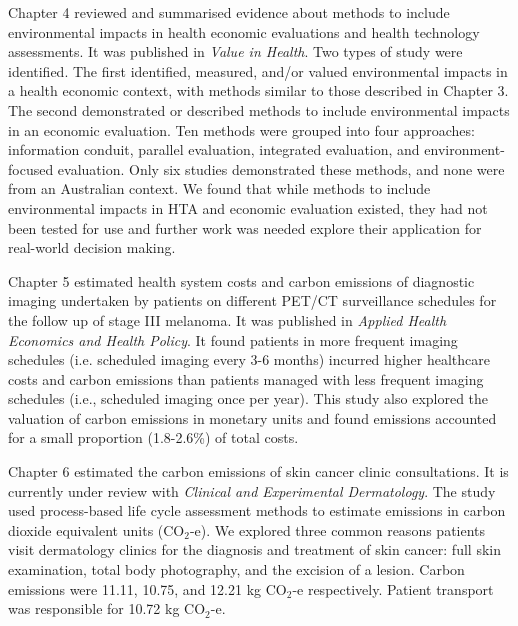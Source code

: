 \begin{refsection}
Chapter 4 reviewed and summarised evidence about methods to include environmental impacts in health economic evaluations and health technology assessments. It was published in \textit{Value in Health}. Two types of study were identified. The first identified, measured, and/or valued environmental impacts in a health economic context, with methods similar to those described in Chapter 3. The second demonstrated or described methods to include environmental impacts in an economic evaluation. Ten methods were grouped into four approaches: information conduit, parallel evaluation, integrated evaluation, and environment-focused evaluation. Only six studies demonstrated these methods, and none were from an Australian context. We found that while methods to include environmental impacts in HTA and economic evaluation existed, they had not been tested for use and further work was needed explore their application for real-world decision making. 

Chapter 5 estimated health system costs and carbon emissions of diagnostic imaging undertaken by patients on different PET/CT surveillance schedules for the follow up of stage III melanoma. It was published in \textit{Applied Health Economics and Health Policy}. It found patients in more frequent imaging schedules (i.e. scheduled imaging every 3-6 months) incurred higher healthcare costs and carbon emissions than patients managed with less frequent imaging schedules (i.e., scheduled imaging once per year). This study also explored the valuation of carbon emissions in monetary units and found emissions accounted for a small proportion (1.8-2.6\%) of total costs.

Chapter 6 estimated the carbon emissions of skin cancer clinic consultations. It is currently under review with \textit{Clinical and Experimental Dermatology}. The study used process-based life cycle assessment methods to estimate emissions in carbon dioxide equivalent units (CO$_{2}$-e). We explored three common reasons patients visit dermatology clinics for the diagnosis and treatment of skin cancer: full skin examination, total body photography, and the excision of a lesion. Carbon emissions were 11.11, 10.75, and 12.21 kg CO$_{2}$-e respectively. Patient transport was responsible for 10.72 kg CO$_{2}$-e.


\end{refsection}
